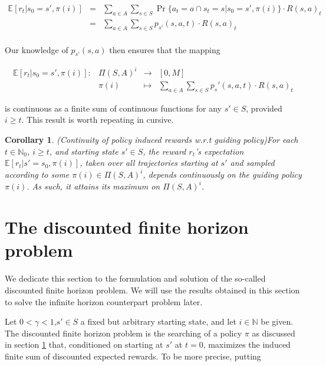 \documentclass[11pt]{article} %
\newtheorem{cor}{Corollary}
\begin{document}
\begin{equation}\label{eqExpReward}
	\begin{array}{rcl}
		\mathbb{E}[r_t | s_0 = s', \pi(i)]	& = &	\sum\limits_{a \in A} \sum\limits_{s \in S} \Pr \{a_t = a \cap s_t = s | s_0 = s', \pi(i)\} \cdot R(s,a)_t \\
								& = &	\sum\limits_{a \in A} \sum\limits_{s \in S} p_{s'}(s,a,t) \cdot R(s,a)_t \\
	\end{array}
\end{equation}

Our knowledge of $p_{s'}(s,a)$ then ensures that the mapping

\begin{equation}\label{contExpRewMap}
	\begin{array}{rccl}
		\mathbb{E}[r_t | s_0 = s', \pi(i)]: 	& \Pi(S,A)^i 	& \rightarrow 	& [0,M] \\
									& \pi(i)				 		& \mapsto 	& \sum\limits_{a \in A} \sum\limits_{s \in S} p_s'(s,a,t) \cdot R(s,a)_t
	\end{array}
\end{equation}

is continuous as a finite sum of continuous functions for any $s' \in S$, provided $i \ge t$. This result is worth repeating in cursive.

\begin{cor}{(Continuity of policy induced rewards w.r.t guiding policy)}\label{corContinuousReward}
For each $t \in \mathbb{N}_0$, $i \ge t$, and starting state $s' \in S$, the reward $r_t$'s expectation $\mathbb{E}[r_t | s' = s_0, \pi(i)]$, taken over all trajectories starting at $s'$ and sampled according to some $\pi(i) \in \Pi(S,A)^i$, depends continuously on the guiding policy $\pi(i)$. As such, it attains its maximum on $\Pi(S,A)^i$.
\end{cor}

\section{The discounted finite horizon problem}

We dedicate this section to the formulation and solution of the so-called discounted finite horizon problem. We will use the results obtained in this section to solve the infinite horizon counterpart problem later.

Let $0 < \gamma < 1$,$s' \in S$ a fixed but arbitrary starting state, and let $i \in \mathbb{N}$ be given. The discounted finite horizon problem is the searching of a policy $\pi$ as discussed in section \ref{} that, conditioned on starting at $s'$ at $t=0$, maximizes the induced finite sum of discounted expected rewards. To be more precise, putting
\end{document}

